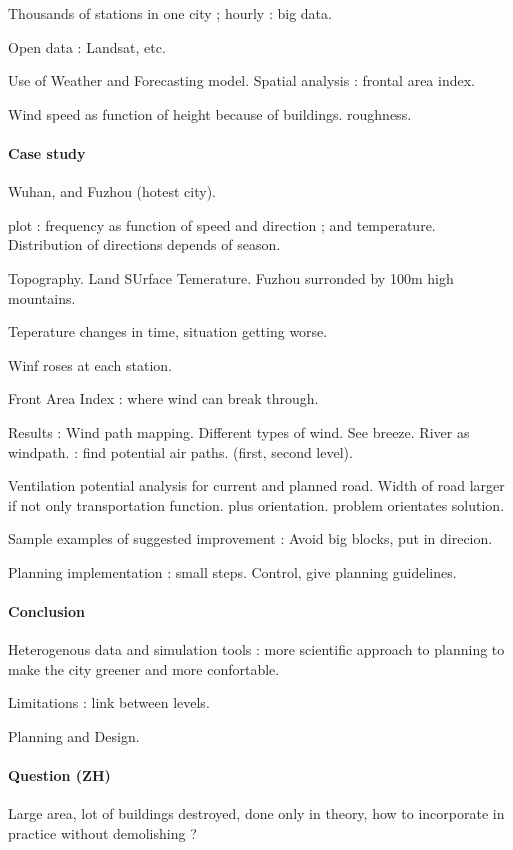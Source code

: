 Thousands of stations in one city ; hourly : big data.

Open data : Landsat, etc.

Use of Weather and Forecasting model. Spatial analysis : frontal area index.

Wind speed as function of height because of buildings. roughness.

\paragraph{Case study}

Wuhan, and Fuzhou (hotest city).

plot : frequency as function of speed and direction ; and temperature. Distribution of directions depends of season.

Topography. Land SUrface Temerature. Fuzhou surronded by 100m high mountains.

Teperature changes in time, situation getting worse.

Winf roses at each station.

Front Area Index : where wind can break through.

Results : Wind path mapping. Different types of wind. See breeze. River as windpath. : find potential air paths. (first, second level).

Ventilation potential analysis for current and planned road. Width of road larger if not only transportation function. plus orientation. problem orientates solution.

Sample examples of suggested improvement : Avoid big blocks, put in direcion.

Planning implementation : small steps. Control, give planning guidelines.

\paragraph{Conclusion}

Heterogenous data and simulation tools : more scientific approach to planning to make the city greener and more confortable.

Limitations : link between levels.

Planning and Design.

\paragraph{Question (ZH)}

Large area, lot of buildings destroyed, done only in theory, how to incorporate in practice without demolishing ?

